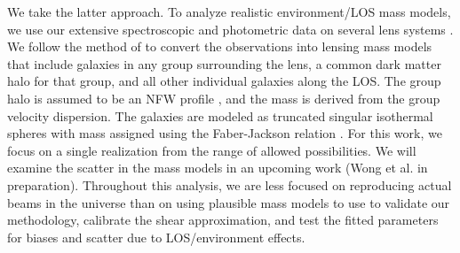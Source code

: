We take the latter approach. To analyze realistic environment/LOS mass models, we use our extensive spectroscopic and photometric data on several lens systems \citep{Wong11}. We follow the method of \citet{Wong11} to convert the observations into lensing mass models that include galaxies in any group surrounding the lens, a common dark matter halo for that group, and all other individual galaxies along the LOS. The group halo is assumed to be an NFW profile \citep{Navarro96}, and the mass is derived from the group velocity dispersion. The galaxies are modeled as truncated singular isothermal spheres with mass assigned using the Faber-Jackson relation \citep{Faber76}. For this work, we focus on a single realization from the range of allowed possibilities. We will examine the scatter in the mass models in an upcoming work (Wong et al. in preparation). Throughout this analysis, we are less focused on reproducing actual beams in the universe than on using plausible mass models to use to validate our methodology, calibrate the shear approximation, and test the fitted parameters for biases and scatter due to LOS/environment effects.
  
  